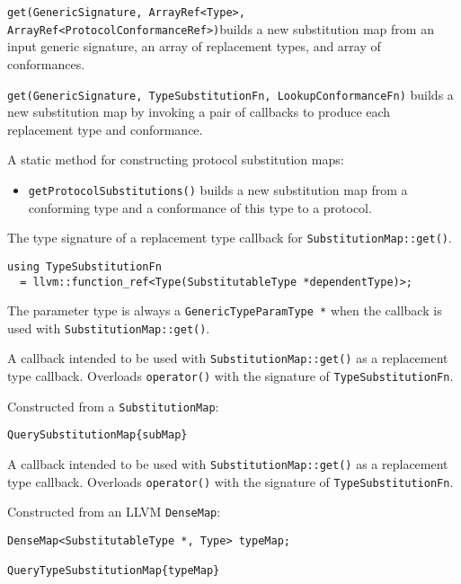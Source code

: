 \documentclass[../generics]{subfiles}
\begin{document}
\medskip
\noindent
\texttt{get(GenericSignature, ArrayRef<Type>, ArrayRef<ProtocolConformanceRef>)}\newline builds a new substitution map from an input generic signature, an array of replacement types, and array of conformances.

\medskip
\noindent
\texttt{get(GenericSignature, TypeSubstitutionFn, LookupConformanceFn)} builds a new substitution map by invoking a pair of callbacks to produce each replacement type and conformance.

A static method for constructing protocol substitution maps:
\begin{itemize}
\item \texttt{getProtocolSubstitutions()} builds a new substitution map from a conforming type and a conformance of this type to a protocol.
\end{itemize}

The type signature of a replacement type callback for \texttt{SubstitutionMap::get()}.
\begin{verbatim}
using TypeSubstitutionFn
  = llvm::function_ref<Type(SubstitutableType *dependentType)>;
\end{verbatim}
The parameter type is always a \texttt{GenericTypeParamType *} when the callback is used with \texttt{SubstitutionMap::get()}.

A callback intended to be used with \texttt{SubstitutionMap::get()} as a replacement type callback.
Overloads \texttt{operator()} with the signature of \texttt{TypeSubstitutionFn}.

Constructed from a \texttt{SubstitutionMap}:
\begin{Verbatim}
QuerySubstitutionMap{subMap}
\end{Verbatim}

A callback intended to be used with \texttt{SubstitutionMap::get()} as a replacement type callback.
Overloads \texttt{operator()} with the signature of \texttt{TypeSubstitutionFn}.

Constructed from an LLVM \texttt{DenseMap}:
\begin{Verbatim}
DenseMap<SubstitutableType *, Type> typeMap;

QueryTypeSubstitutionMap{typeMap}
\end{Verbatim}
\end{document}
